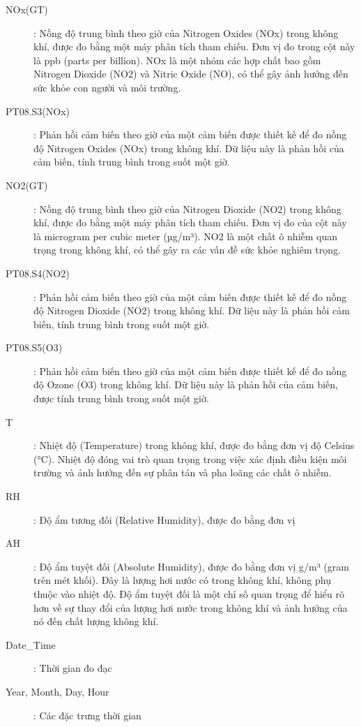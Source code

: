 \begin{description}
    \item[NOx(GT)]: Nồng độ trung bình theo giờ của Nitrogen Oxides (NOx) trong không khí, được đo bằng một máy phân tích tham chiếu. Đơn vị đo trong cột này là ppb (parts per billion). NOx là một nhóm các hợp chất bao gồm Nitrogen Dioxide (NO2) và Nitric Oxide (NO), có thể gây ảnh hưởng đến sức khỏe con người và môi trường.

    \item[PT08.S3(NOx)]: Phản hồi cảm biến theo giờ của một cảm biến được thiết kế để đo nồng độ Nitrogen Oxides (NOx) trong không khí. Dữ liệu này là phản hồi của cảm biến, tính trung bình trong suốt một giờ.

    \item[NO2(GT)]: Nồng độ trung bình theo giờ của Nitrogen Dioxide (NO2) trong không khí, được đo bằng một máy phân tích tham chiếu. Đơn vị đo của cột này là microgram per cubic meter (µg/m³). NO2 là một chất ô nhiễm quan trọng trong không khí, có thể gây ra các vấn đề sức khỏe nghiêm trọng.

    \item[PT08.S4(NO2)]: Phản hồi cảm biến theo giờ của một cảm biến được thiết kế để đo nồng độ Nitrogen Dioxide (NO2) trong không khí. Dữ liệu này là phản hồi cảm biến, tính trung bình trong suốt một giờ.

    \item[PT08.S5(O3)]: Phản hồi cảm biến theo giờ của một cảm biến được thiết kế để đo nồng độ Ozone (O3) trong không khí. Dữ liệu này là phản hồi của cảm biến, được tính trung bình trong suốt một giờ.

    \item[T]: Nhiệt độ (Temperature) trong không khí, được đo bằng đơn vị độ Celsius (°C). Nhiệt độ đóng vai trò quan trọng trong việc xác định điều kiện môi trường và ảnh hưởng đến sự phân tán và pha loãng các chất ô nhiễm.

    \item[RH]: Độ ẩm tương đối (Relative Humidity), được đo bằng đơn vị %

    \item[AH]: Độ ẩm tuyệt đối (Absolute Humidity), được đo bằng đơn vị g/m³ (gram trên mét khối). Đây là lượng hơi nước có trong không khí, không phụ thuộc vào nhiệt độ. Độ ẩm tuyệt đối là một chỉ số quan trọng để hiểu rõ hơn về sự thay đổi của lượng hơi nước trong không khí và ảnh hưởng của nó đến chất lượng không khí.

    \item[Date\_Time]: Thời gian đo đạc
    \item[Year, Month, Day, Hour]: Các đặc trưng thời gian
\end{description}

